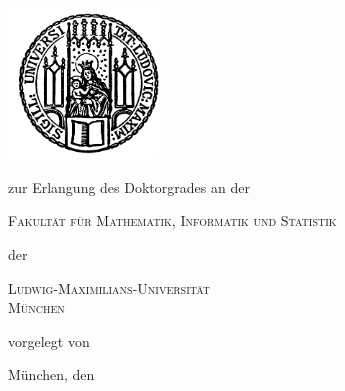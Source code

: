 
\begin{titlepage}
	\begin{center}
  \makeatletter
        \includegraphics[width=0.3\textwidth]{Styles/lmu_siegel}\\
        \vskip 1cm
		\textsc{\huge \@title}
                \vskip 1cm
                \begin{large}
                  zur Erlangung des Doktorgrades an der\\[0.50cm]
                  \begin{Large}
                    \textsc{Fakultät für Mathematik, Informatik und Statistik}\\[0.50cm]
                  \end{Large}
                  der\\[0.50cm]
                  \begin{Large}
                    \textsc{Ludwig-Maximilians-Universität\\München}\par
                  \end{Large}
                \end{large}
		\vfill
                {\large vorgelegt von}\\[0.5cm]
                \begin{LARGE}
                    {\bfseries \@author}
                \end{LARGE}
    \vskip 1cm
    \begin{small}
        München, den \@submissionDate
    \end{small}
  \makeatother
	\end{center}
\end{titlepage}


